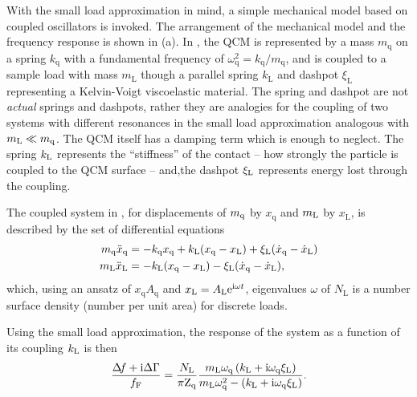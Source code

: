 With the small load approximation in mind, a simple mechanical model based
on coupled oscillators is invoked.  The arrangement of the mechanical model
and the frequency response is shown in (a).  In
, the QCM is represented by a mass
$m_\mathrm{q}$ on a spring $k_\mathrm{q}$ with a fundamental frequency of
$\omega_\mathrm{q}^2=k_\mathrm{q}/m_\mathrm{q}$, and is coupled to a sample
load with mass $m_\mathrm{L}$ though a parallel spring $k_\mathrm{L}$ and
dashpot $\xi_\mathrm{L}$ representing a Kelvin-Voigt viscoelastic material.
The spring and dashpot are not \textit{actual} springs and dashpots, rather
they are analogies for the coupling of two systems with different
resonances in the small load approximation analogous with $m_\mathrm{L}\ll m_\mathrm{q}$.  The
QCM itself has a damping term which is enough to neglect.  The spring $k_\mathrm{L}$
represents the ``stiffness'' of the contact -- how strongly the particle is
coupled to the QCM surface -- and,the dashpot $\xi_\mathrm{L}$ represents energy lost
through the coupling.  

The coupled system in , for displacements of
$m_\mathrm{q}$ by $x_\mathrm{q}$ and $m_\mathrm{L}$ by $x_\mathrm{L}$, is described by the
set of differential equations
\begin{align}
 m_\mathrm{q} \ddot{x}_\mathrm{q} &= -k_\mathrm{q} x_\mathrm{q} +k_\mathrm{L} (x_\mathrm{q}-x_\mathrm{L}) + \xi_\mathrm{L} (\dot{x}_\mathrm{q}-\dot{x}_\mathrm{L})\\
 m_\mathrm{L} \ddot{x}_\mathrm{L} &= -k_\mathrm{L} (x_\mathrm{q}-x_\mathrm{L}) - \xi_\mathrm{L} (\dot{x}_\mathrm{q}-\dot{x}_\mathrm{L}),
\end{align}
which, using an ansatz of
$x_\mathrm{q}A_\mathrm{q}$ and $x_\mathrm{L}=A_\mathrm{L}{\mathrm{e}}^{{\mathrm{i}} \omega
t}$, 
eigenvalues $\omega$ of
$N_\mathrm{L}$ is a number surface density (number per unit area) for discrete
loads.

Using the small load approximation, the response of the system
as a function of its coupling $k_\mathrm{L}$ is then
\begin{equation}
\frac{\Delta\!f + {\mathrm{i}} \Delta \Gamma}{f_\mathrm{F}} = \frac{N_\mathrm{L}}{\pi
\mathrm{Z}_\mathrm{q}}
\frac{m_\mathrm{L} \omega_\mathrm{q} \left( k_\mathrm{L} + {\mathrm{i}}
\omega_\mathrm{q} \xi_\mathrm{L}\right) }
{m_\mathrm{L} \omega_\mathrm{q}^2 - \left(k_\mathrm{L} + {\mathrm{i}}
\omega_\mathrm{q} \xi_\mathrm{L}\right)}.
\label{eqn:mastereq}
\end{equation}

